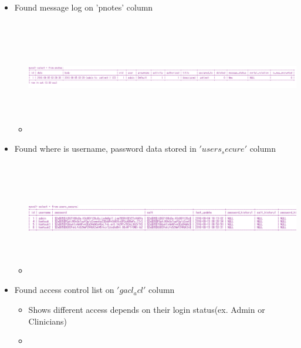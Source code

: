 \documentclass[paper=a4, fontsize=11pt]{scrartcl} %
\numberwithin{equation}{section} %
\numberwithin{figure}{section} %
\numberwithin{table}{section} %
\begin{document}
\begin{itemize}
\begin{itemize}
		\end{itemize}
	\item Found message log on 'pnotes' column
		\begin{itemize}	
			\item
			 \includegraphics[width = 35cm, height=5cm]{pictures/wherepnotes.png}
		\end{itemize}
	\item Found where is username, password data stored in $'users_secure'$ column
		\begin{itemize}	
			\item
			 \includegraphics[width = 35cm, height=5cm]{pictures/wherepassword.png}
		\end{itemize} 
\vspace{3cm}
	\item Found access control list on $'gacl_acl'$ column
		\begin{itemize}	
			\item Shows different access depends on their login status(ex. Admin or Clinicians)
			\item

\end{itemize}
\end{itemize}
\end{document}
